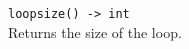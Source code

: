 \begin{basedescript}{\desclabelstyle{\pushlabel}}
   \item[\hspace{-1em}]\colorbox{gray!30}{\lstinline[style=pykw]|loopsize() -> int|} \vspace{0.1cm}\\
   Returns the size of the loop.
\end{basedescript}